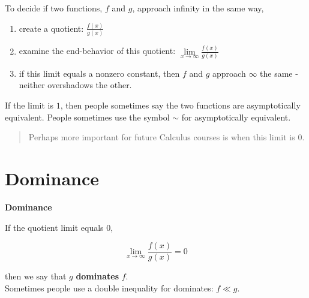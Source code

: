 \documentclass{ximera}
\begin{document}
\begin{idea}


To decide if two functions, $f$ and $g$, approach infinity in the same way, 

\begin{enumerate}
\item create a quotient: $\frac{f(x)}{g(x)}$ \\


\item examine the end-behavior of this quotient: $\lim\limits_{x \to \infty} \frac{f(x)}{g(x)}$ \\


\item if this limit equals a nonzero constant, then $f$ and $g$ approach $\infty$ the same - neither overshadows the other.
\end{enumerate}


If the limit is $1$, then people sometimes say the two functions are asymptotically equivalent. People sometimes use the symbol $\sim$ for asymptotically equivalent. \\

\end{idea}




\begin{quote}

Perhaps more important for future Calculus courses is when this limit is $0$. \\

\end{quote}















\section{Dominance}



\begin{definition}  \textbf{\textcolor{green!50!black}{Dominance}} 

If the quotient limit equals $0$,

\[  \lim_{x \to \infty} \frac{f(x)}{g(x)}  = 0\]

then we say that $g$ \textbf{dominates} $f$. \\



Sometimes people use a double inequality for dominates:  $f \ll g$.\\

\end{definition}
\end{document}
